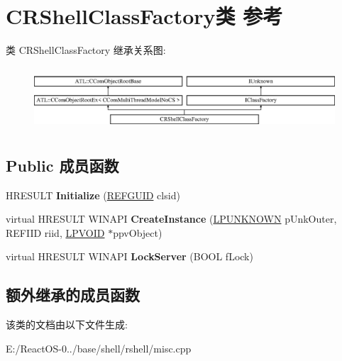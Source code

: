 \hypertarget{class_c_r_shell_class_factory}{}\section{C\+R\+Shell\+Class\+Factory类 参考}
\label{class_c_r_shell_class_factory}
类 C\+R\+Shell\+Class\+Factory 继承关系图\+:\begin{figure}[H]
\begin{center}
\leavevmode
\includegraphics[height=2.386364cm]{class_c_r_shell_class_factory}
\end{center}
\end{figure}
\subsection*{Public 成员函数}
\begin{DoxyCompactItemize}
\item 
\mbox{\label{class_c_r_shell_class_factory_a8c57fc9a3d5f907db641c98366038e41}} 
H\+R\+E\+S\+U\+LT {\bfseries Initialize} (\hyperlink{struct___g_u_i_d}{R\+E\+F\+G\+U\+ID} clsid)
\item 
\mbox{\label{class_c_r_shell_class_factory_a7ed77c7676967a4e40ee168bda6fd29b}} 
virtual H\+R\+E\+S\+U\+LT W\+I\+N\+A\+PI {\bfseries Create\+Instance} (\hyperlink{interface_i_unknown}{L\+P\+U\+N\+K\+N\+O\+WN} p\+Unk\+Outer, R\+E\+F\+I\+ID riid, \hyperlink{interfacevoid}{L\+P\+V\+O\+ID} $\ast$ppv\+Object)
\item 
\mbox{\label{class_c_r_shell_class_factory_ade37dfe23cf401fd142e5106b8732a43}} 
virtual H\+R\+E\+S\+U\+LT W\+I\+N\+A\+PI {\bfseries Lock\+Server} (B\+O\+OL f\+Lock)
\end{DoxyCompactItemize}
\subsection*{额外继承的成员函数}


该类的文档由以下文件生成\+:\begin{DoxyCompactItemize}
\item 
E\+:/\+React\+O\+S-\/0../base/shell/rshell/misc.\+cpp\end{DoxyCompactItemize}
